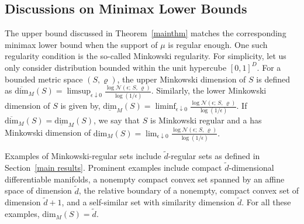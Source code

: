 \documentclass[12pts]{article}
\newcommand{\cN}{ \mathcal{N}}
\begin{document}
\subsection{Discussions on Minimax Lower Bounds} \label{minimax bounds}
The upper bound discussed in Theorem~\ref{mainthm} matches the corresponding minimax lower bound when the support of $\mu$ is regular enough. One such regularity condition is the so-called Minkowski regularity. For simplicity, let us only consider distribution bounded within the unit hypercube $[0,1]^D$. For a bounded metric space $(S, \varrho)$, the upper Minkowski dimension of $S$ is defined as \(\overline{\text{dim}}_M(S) = \limsup_{\epsilon \downarrow 0} \frac{\log \cN(\epsilon; \, S,\, \varrho )}{\log(1/\epsilon)}.\) Similarly, 
the lower Minkowski dimension of $S$ is given by, 
\(\underline{\text{dim}}_M(S) = \liminf_{\epsilon \downarrow 0} \frac{\log \cN(\epsilon; \, S,\, \varrho )}{\log(1/\epsilon)}.\)
If $\overline{\text{dim}}_M(S) = \underline{\text{dim}}_M(S)$, we say that $S$ is Minkowski regular and a has Minkowski dimension of $\text{dim}_M(S) = \lim_{\epsilon \downarrow 0} \frac{\log \cN(\epsilon; \, S,\, \varrho )}{\log(1/\epsilon)}.$ 

Examples of Minkowski-regular sets include $\tilde{d}$-regular sets as defined in Section~\ref{main results}. Prominent examples include compact $\tilde{d}$-dimensional differentiable manifolds, a nonempty compact convex set spanned by an affine space of dimension $\tilde{d}$, the relative boundary of a nonempty, compact convex set of dimension $\tilde{d}+1$, and a self-similar set with similarity dimension $\tilde{d}$. For all these examples, $\text{dim}_M(S) = \tilde{d}$.
\end{document}
